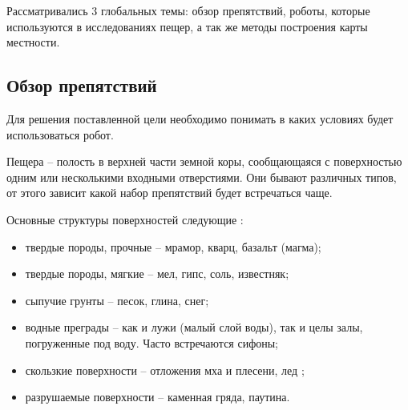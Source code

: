 Рассматривались 3 глобальных темы: обзор препятствий, роботы, которые используются в исследованиях пещер, а так же методы построения карты местности.

\subsection{Обзор
препятствий}

Для решения поставленной цели необходимо понимать в каких условиях будет использоваться робот.

Пещера -- полость в верхней части земной коры, сообщающаяся с поверхностью одним или несколькими входными отверстиями. Они бывают различных типов, от этого зависит какой набор препятствий будет встречаться чаще.

Основные структуры поверхностей следующие :
\begin{itemize}
    \item твердые породы, прочные -- мрамор, кварц, базальт (магма);
    \item твердые породы, мягкие -- мел, гипс, соль, известняк;
    \item сыпучие грунты -- песок, глина, снег;
    \item водные преграды -- как и лужи (малый слой воды), так и целы залы, погруженные под воду. Часто встречаются сифоны;
    \item скользкие поверхности -- отложения мха и плесени, лед ;
    \item разрушаемые поверхности -- каменная гряда, паутина.
\end{itemize}

